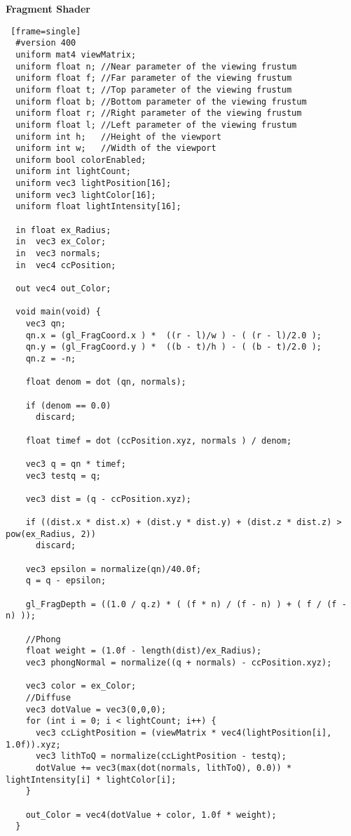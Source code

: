 \textbf{Fragment Shader}
\begin{lstlisting} [frame=single]
  #version 400
  uniform mat4 viewMatrix;
  uniform float n; //Near parameter of the viewing frustum
  uniform float f; //Far parameter of the viewing frustum
  uniform float t; //Top parameter of the viewing frustum
  uniform float b; //Bottom parameter of the viewing frustum
  uniform float r; //Right parameter of the viewing frustum
  uniform float l; //Left parameter of the viewing frustum
  uniform int h;   //Height of the viewport
  uniform int w;   //Width of the viewport
  uniform bool colorEnabled;
  uniform int lightCount;
  uniform vec3 lightPosition[16];
  uniform vec3 lightColor[16];
  uniform float lightIntensity[16];

  in float ex_Radius;
  in  vec3 ex_Color;
  in  vec3 normals;
  in  vec4 ccPosition;

  out vec4 out_Color;

  void main(void) {
    vec3 qn;
    qn.x = (gl_FragCoord.x ) *  ((r - l)/w ) - ( (r - l)/2.0 );
    qn.y = (gl_FragCoord.y ) *  ((b - t)/h ) - ( (b - t)/2.0 );
    qn.z = -n;

    float denom = dot (qn, normals);

    if (denom == 0.0)
      discard;

    float timef = dot (ccPosition.xyz, normals ) / denom;

    vec3 q = qn * timef;
    vec3 testq = q;

    vec3 dist = (q - ccPosition.xyz);

    if ((dist.x * dist.x) + (dist.y * dist.y) + (dist.z * dist.z) > pow(ex_Radius, 2))
      discard;

    vec3 epsilon = normalize(qn)/40.0f;
    q = q - epsilon;

    gl_FragDepth = ((1.0 / q.z) * ( (f * n) / (f - n) ) + ( f / (f - n) ));

    //Phong
    float weight = (1.0f - length(dist)/ex_Radius);
    vec3 phongNormal = normalize((q + normals) - ccPosition.xyz);

    vec3 color = ex_Color;
    //Diffuse
    vec3 dotValue = vec3(0,0,0);
    for (int i = 0; i < lightCount; i++) {
      vec3 ccLightPosition = (viewMatrix * vec4(lightPosition[i], 1.0f)).xyz;
      vec3 lithToQ = normalize(ccLightPosition - testq);
      dotValue += vec3(max(dot(normals, lithToQ), 0.0)) * lightIntensity[i] * lightColor[i];
    }

    out_Color = vec4(dotValue + color, 1.0f * weight);
  }
\end{lstlisting}
\newpage


